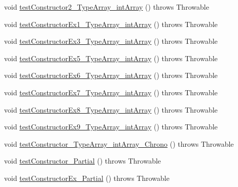 \begin{DoxyCompactItemize}
\item 
void \hyperlink{classorg_1_1joda_1_1time_1_1_test_partial___constructors_a712eaf57bce77fd6e24cb8c8cb81d65a}{test\-Constructor2\-\_\-\-Type\-Array\-\_\-int\-Array} ()  throws Throwable 
\item 
void \hyperlink{classorg_1_1joda_1_1time_1_1_test_partial___constructors_ab118b77d8dd810d1cc62659f7d95c5a1}{test\-Constructor\-Ex1\-\_\-\-Type\-Array\-\_\-int\-Array} ()  throws Throwable 
\item 
void \hyperlink{classorg_1_1joda_1_1time_1_1_test_partial___constructors_a073efea1619362066e09d6624533564d}{test\-Constructor\-Ex3\-\_\-\-Type\-Array\-\_\-int\-Array} ()  throws Throwable 
\item 
void \hyperlink{classorg_1_1joda_1_1time_1_1_test_partial___constructors_ac40d51c720f81ca92c4c1a755fe96e26}{test\-Constructor\-Ex5\-\_\-\-Type\-Array\-\_\-int\-Array} ()  throws Throwable 
\item 
void \hyperlink{classorg_1_1joda_1_1time_1_1_test_partial___constructors_ae726e129c3a3a9c3638e9a791d23377f}{test\-Constructor\-Ex6\-\_\-\-Type\-Array\-\_\-int\-Array} ()  throws Throwable 
\item 
void \hyperlink{classorg_1_1joda_1_1time_1_1_test_partial___constructors_a38805ba2716720e4594a987c436e1643}{test\-Constructor\-Ex7\-\_\-\-Type\-Array\-\_\-int\-Array} ()  throws Throwable 
\item 
void \hyperlink{classorg_1_1joda_1_1time_1_1_test_partial___constructors_aa3f9cab6d78b937615515a8230972534}{test\-Constructor\-Ex8\-\_\-\-Type\-Array\-\_\-int\-Array} ()  throws Throwable 
\item 
void \hyperlink{classorg_1_1joda_1_1time_1_1_test_partial___constructors_a219cf3611af785a62baa5c98afac3d47}{test\-Constructor\-Ex9\-\_\-\-Type\-Array\-\_\-int\-Array} ()  throws Throwable 
\item 
void \hyperlink{classorg_1_1joda_1_1time_1_1_test_partial___constructors_af04297d8365cc3223b384e1997c7c93c}{test\-Constructor\-\_\-\-Type\-Array\-\_\-int\-Array\-\_\-\-Chrono} ()  throws Throwable 
\item 
void \hyperlink{classorg_1_1joda_1_1time_1_1_test_partial___constructors_ab41d2f246b809d3f01f3b83502bac757}{test\-Constructor\-\_\-\-Partial} ()  throws Throwable 
\item 
void \hyperlink{classorg_1_1joda_1_1time_1_1_test_partial___constructors_a2323706a06850059fdc45c2406b6f01c}{test\-Constructor\-Ex\-\_\-\-Partial} ()  throws Throwable 
\end{DoxyCompactItemize}
